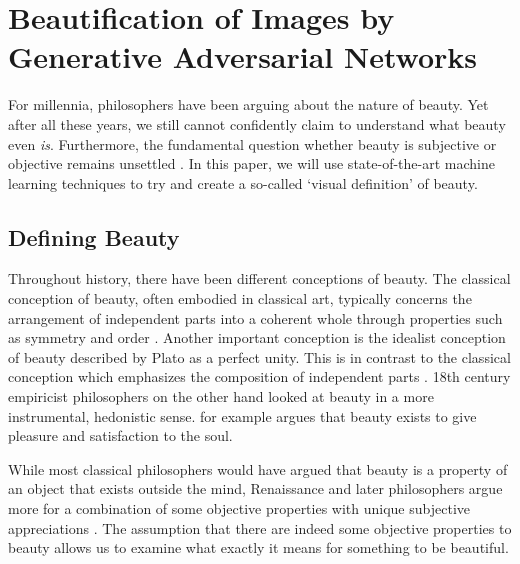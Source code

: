 \documentclass[../main.tex]{subfiles}
\begin{document}
\section{Beautification of Images by Generative Adversarial Networks}
For millennia, philosophers have been arguing about the nature of beauty. Yet after all these years, we still cannot confidently claim to understand what beauty even \textit{is}. Furthermore, the fundamental question whether beauty is subjective or objective remains unsettled \parencite{sep-beauty}. In this paper, we will use state-of-the-art machine learning techniques to try and create a so-called `visual definition' of beauty.


\subsection{Defining Beauty}
Throughout history, there have been different conceptions of beauty. The classical conception of beauty, often embodied in classical art, typically concerns the arrangement of independent parts into a coherent whole through properties such as symmetry and order \parencite{wolfflin1932principles, sep-beauty}. Another important conception is the idealist conception of beauty described by Plato as a perfect unity. This is in contrast to the classical conception which emphasizes the composition of independent parts \parencite{sep-beauty}. 18th century empiricist philosophers on the other hand looked at beauty in a more instrumental, hedonistic sense. \textcite{hume2003treatise} for example argues that beauty exists to give pleasure and satisfaction to the soul.

While most classical philosophers would have argued that beauty is a property of an object that exists outside the mind, Renaissance and later philosophers argue more for a combination of some objective properties with unique subjective appreciations \parencite{sartwell2017entanglements}. The assumption that there are indeed some objective properties to beauty allows us to examine what exactly it means for something to be beautiful.




\end{document}
